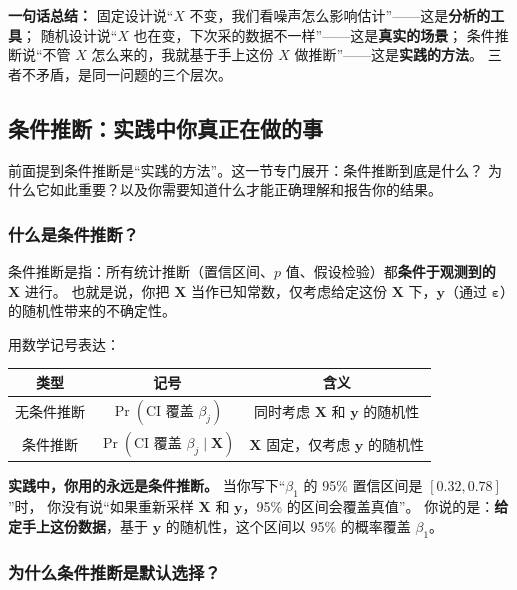 \medskip
\textbf{一句话总结：}
固定设计说``$X$ 不变，我们看噪声怎么影响估计''——这是\textbf{分析的工具}；
随机设计说``$X$ 也在变，下次采的数据不一样''——这是\textbf{真实的场景}；
条件推断说``不管 $X$ 怎么来的，我就基于手上这份 $X$ 做推断''——这是\textbf{实践的方法}。
三者不矛盾，是同一问题的三个层次。

\subsection{条件推断：实践中你真正在做的事}

前面提到条件推断是``实践的方法''。这一节专门展开：条件推断到底是什么？
为什么它如此重要？以及你需要知道什么才能正确理解和报告你的结果。

\subsubsection{什么是条件推断？}

\begin{definition}
条件推断是指：所有统计推断（置信区间、$p$ 值、假设检验）都\textbf{条件于观测到的 $\mathbf{X}$} 进行。
也就是说，你把 $\mathbf{X}$ 当作已知常数，仅考虑给定这份 $\mathbf{X}$ 下，$\mathbf{y}$（通过 $\bm{\varepsilon}$）的随机性带来的不确定性。
\end{definition}

用数学记号表达：

\begin{center}
\begin{tabular}{c|c|c}
\toprule
\textbf{类型} & \textbf{记号} & \textbf{含义} \\
\midrule
无条件推断 & $\Pr(\text{CI 覆盖 } \beta_j)$
    & 同时考虑 $\mathbf{X}$ 和 $\mathbf{y}$ 的随机性 \\
条件推断   & $\Pr(\text{CI 覆盖 } \beta_j \mid \mathbf{X})$
    & $\mathbf{X}$ 固定，仅考虑 $\mathbf{y}$ 的随机性 \\
\bottomrule
\end{tabular}
\end{center}

\textbf{实践中，你用的永远是条件推断。} 当你写下``$\beta_1$ 的 95\% 置信区间是 $[0.32, 0.78]$''时，
你没有说``如果重新采样 $\mathbf{X}$ 和 $\mathbf{y}$，95\% 的区间会覆盖真值''。
你说的是：\textbf{给定手上这份数据}，基于 $\mathbf{y}$ 的随机性，这个区间以 95\% 的概率覆盖 $\beta_1$。

\subsubsection{为什么条件推断是默认选择？}

